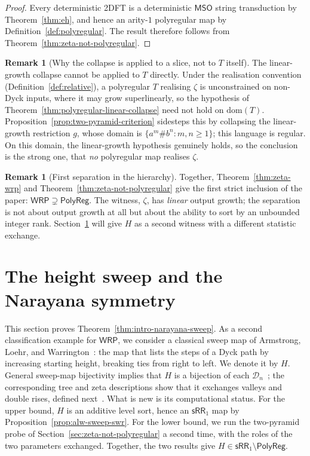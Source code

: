 \documentclass[11pt]{article}
\theoremstyle{definition}
\newtheorem{remark}[theorem]{Remark}
\newcommand{\D}{\mathcal D}
\newcommand{\WRP}{\mathsf{WRP}}
\newcommand{\SWR}{\mathsf{sRR}_1}
\newcommand{\MSO}{\mathsf{MSO}}
\newcommand{\polyreg}{\mathsf{PolyReg}}
\begin{document}
\begin{proof}
Every deterministic 2DFT is a deterministic $\MSO$ string transduction by
Theorem~\ref{thm:eh}, and hence an arity-$1$ polyregular map by
Definition~\ref{def:polyregular}.  The result therefore follows from
Theorem~\ref{thm:zeta-not-polyregular}.
\end{proof}

\begin{remark}[Why the collapse is applied to a slice, not to $T$ itself]
The linear-growth collapse cannot be applied to $T$ directly.  Under the
realisation convention (Definition~\ref{def:relative}), a polyregular $T$
realising $\zeta$ is unconstrained on non-Dyck inputs, where it may grow
superlinearly, so the hypothesis of
Theorem~\ref{thm:polyregular-linear-collapse} need not hold on
$\mathrm{dom}(T)$.  Proposition~\ref{prop:two-pyramid-criterion} sidesteps
this by collapsing the linear-growth restriction $g$, whose domain is
$\{a^m\#b^n:m,n\ge 1\}$; this language is regular.  On this domain, the
linear-growth hypothesis genuinely holds, so the conclusion is the strong
one, that \emph{no} polyregular map realises $\zeta$.
\end{remark}

\begin{remark}[First separation in the hierarchy]
Together, Theorem~\ref{thm:zeta-wrp} and
Theorem~\ref{thm:zeta-not-polyregular} give the first strict inclusion of the
paper: $\WRP\supsetneq\polyreg$.  The witness, $\zeta$, has \emph{linear}
output growth; the separation is not about output growth at all but about the
ability to sort by an unbounded integer rank.  Section~\ref{sec:narayana-sweep}
will give $H$ as a second witness with a different statistic exchange.
\end{remark}

\section{The height sweep and the Narayana symmetry}
\label{sec:narayana-sweep}

This section proves Theorem~\ref{thm:intro-narayana-sweep}.  As a second
classification example for $\WRP$, we consider a classical sweep map of
Armstrong, Loehr, and Warrington~\cite{ArmstrongLoehrWarrington2015,
ArmstrongLoehrWarrington2016}: the map that lists the steps of a Dyck path by
increasing starting height, breaking ties from right to left.  We denote it by
$H$.  General sweep-map bijectivity implies that $H$ is a bijection of each
$\D_n$~\cite{ThomasWilliams2018}; the corresponding tree and zeta descriptions
show that it exchanges valleys and double rises, defined
next~\cite{CeballosFangMuhle2020,Fang2024,SulzgruberThiel2018}.  What is new is
its computational status.
For the upper bound, $H$ is an additive level sort, hence an $\SWR$ map by
Proposition~\ref{prop:alw-sweep-swr}.  For the lower bound, we run the
two-pyramid probe of Section~\ref{sec:zeta-not-polyregular} a second time,
with the roles of the two parameters exchanged.  Together, the two results
give $H\in\SWR\setminus\polyreg$.
\end{document}
